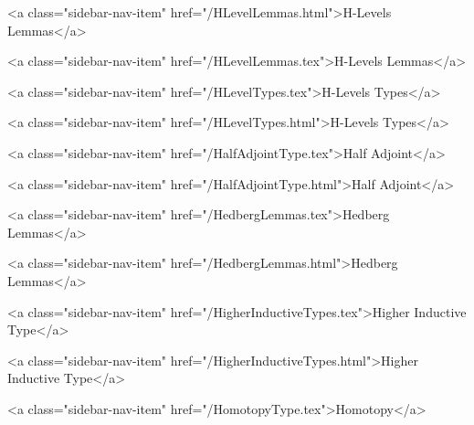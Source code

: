       
        
          <a class="sidebar-nav-item" href="/HLevelLemmas.html">H-Levels Lemmas</a>
        
      
    
      
        
          <a class="sidebar-nav-item" href="/HLevelLemmas.tex">H-Levels Lemmas</a>
        
      
    
      
        
          <a class="sidebar-nav-item" href="/HLevelTypes.tex">H-Levels Types</a>
        
      
    
      
        
          <a class="sidebar-nav-item" href="/HLevelTypes.html">H-Levels Types</a>
        
      
    
      
        
          <a class="sidebar-nav-item" href="/HalfAdjointType.tex">Half Adjoint</a>
        
      
    
      
        
          <a class="sidebar-nav-item" href="/HalfAdjointType.html">Half Adjoint</a>
        
      
    
      
        
          <a class="sidebar-nav-item" href="/HedbergLemmas.tex">Hedberg Lemmas</a>
        
      
    
      
        
          <a class="sidebar-nav-item" href="/HedbergLemmas.html">Hedberg Lemmas</a>
        
      
    
      
        
          <a class="sidebar-nav-item" href="/HigherInductiveTypes.tex">Higher Inductive Type</a>
        
      
    
      
        
          <a class="sidebar-nav-item" href="/HigherInductiveTypes.html">Higher Inductive Type</a>
        
      
    
      
        
          <a class="sidebar-nav-item" href="/HomotopyType.tex">Homotopy</a>
        
